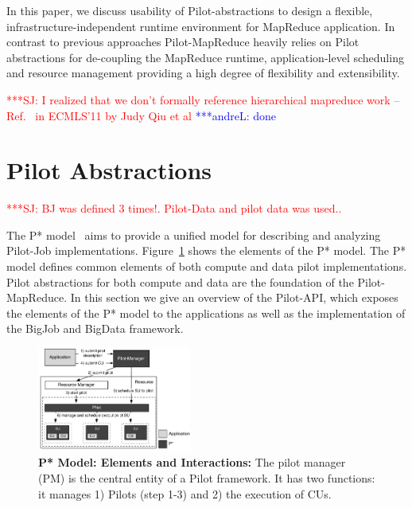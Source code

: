 \documentclass{acm_proc_article-sp}
\newcommand{\jhanote}[1]{ {\textcolor{red} { ***SJ: #1 }}}
\newcommand{\alnote}[1]{ {\textcolor{blue} { ***andreL: #1 }}}
\newcommand{\alnote}[1]{}
\newcommand{\jhanote}[1]{}
\newcommand{\upp}{\vspace*{-0.5em}}
\newcommand{\pilot}{Pilot\xspace}
\newcommand{\pilotjob}{Pilot-Job\xspace}
\newcommand{\pilotmapreduce}{Pilot-MapReduce\xspace}
\newcommand{\cus}{CUs\xspace}
\begin{document}
In this paper, we discuss usability of \pilot-abstractions to design a flexible, 
infrastructure-independent runtime environment for MapReduce application. In 
contrast to previous approaches \pilotmapreduce heavily relies on \pilot 
abstractions for de-coupling the MapReduce runtime, application-level scheduling 
and resource management providing a high degree of flexibility and extensibility.

\jhanote{I realized that we don't formally reference hierarchical
  mapreduce work -- Ref.~\cite{ecmls11-mr-autodock} in ECMLS'11 by
  Judy Qiu et al}\alnote{done}



\upp
\section{Pilot Abstractions}
\label{sec-pilot-impl}

\jhanote{BJ was defined 3 times!. Pilot-Data and pilot data was used..}

The P* model~\cite{pstar-2012} aims to provide a unified model for describing
and analyzing \pilotjob implementations. Figure~\ref{fig:figures_pstar} shows
the elements of the P* model. The P* model defines common elements of both
compute and data pilot implementations. Pilot abstractions for both compute and
data are the foundation of the \pilotmapreduce. In this section we give an
overview of the Pilot-API, which exposes the elements of the P* model to the
applications as well as the implementation of the BigJob and BigData framework.


\begin{figure}[t]
	\upp\upp
    \centering
    \includegraphics[width=0.45\textwidth]{figures/pstar_model_single.pdf}
    \caption{ \textbf{P* Model: Elements and
        Interactions:} The pilot manager (PM) is the central entity of a \pilot 
     framework. It has two functions: it manages 1) Pilots (step 1-3) and 2) the 
     execution of \cus.}
	\upp\upp
    \label{fig:figures_pstar}
\end{figure}
\end{document}
